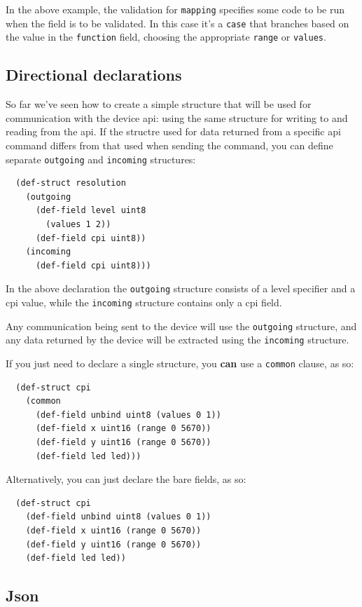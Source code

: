 \documentclass[12pt]{article}
\begin{document}
In the above example, the validation for \verb|mapping| specifies some
code to be run when the field is to be validated. In this case it's a
\verb|case| that branches based on the value in the \verb|function| field,
choosing the appropriate \verb|range| or \verb|values|.

\subsection{Directional declarations}

So far we've seen how to create a simple structure that will be used
for communication with the device api: using the same structure for
writing to and reading from the api. If the structre used for data returned from a
specific api command differs from that used when sending the command,
you can define separate \verb|outgoing| and \verb|incoming| structures:

\begin{verbatim}
  (def-struct resolution
    (outgoing
      (def-field level uint8
        (values 1 2))
      (def-field cpi uint8))
    (incoming
      (def-field cpi uint8)))
\end{verbatim}

In the above declaration the \verb|outgoing| structure consists of a
level specifier and a cpi value, while the \verb|incoming| structure
contains only a cpi field.

Any communication being sent to the device will use the
\verb|outgoing| structure, and any data returned by the device will
be extracted using the \verb|incoming| structure.

If you just need to declare a single
structure, you {\bf can} use a \verb|common| clause, as so:

\begin{verbatim}
  (def-struct cpi
    (common
      (def-field unbind uint8 (values 0 1))
      (def-field x uint16 (range 0 5670))
      (def-field y uint16 (range 0 5670))
      (def-field led led)))
\end{verbatim}

Alternatively, you can just declare the bare fields, as so:

\begin{verbatim}
  (def-struct cpi
    (def-field unbind uint8 (values 0 1))
    (def-field x uint16 (range 0 5670))
    (def-field y uint16 (range 0 5670))
    (def-field led led))
\end{verbatim}

\subsection{Json}
\end{document}
